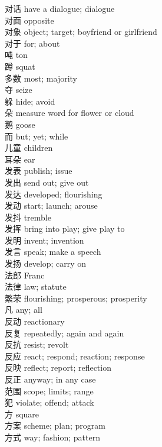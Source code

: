 对话 \quad have a dialogue; dialogue\\
对面 \quad opposite\\
对象 \quad object; target; boyfriend or girlfriend\\
对于 \quad for; about\\
吨 \quad ton\\
蹲 \quad squat\\
多数 \quad most; majority\\
夺 \quad seize\\
躲 \quad hide; avoid\\
朵 \quad measure word for flower or cloud\\
鹅 \quad goose\\
而 \quad but; yet; while\\
儿童 \quad children\\
耳朵 \quad ear\\
发表 \quad publish; issue\\
发出 \quad send out; give out\\
发达 \quad developed; flourishing\\
发动 \quad start; launch; arouse\\
发抖 \quad tremble\\
发挥 \quad bring into play; give play to\\
发明 \quad invent; invention\\
发言 \quad speak; make a speech\\
发扬 \quad develop; carry on\\
法郎 \quad Franc\\
法律 \quad law; statute\\
繁荣 \quad flourishing; prosperous; prosperity\\
凡 \quad any; all\\
反动 \quad reactionary\\
反复 \quad repeatedly; again and again\\
反抗 \quad resist; revolt\\
反应 \quad react; respond; reaction; response\\
反映 \quad reflect; report; reflection\\
反正 \quad anyway; in any case\\
范围 \quad scope; limits; range\\
犯 \quad violate; offend; attack\\
方 \quad square\\
方案 \quad scheme; plan; program\\
方式 \quad way; fashion; pattern\\
